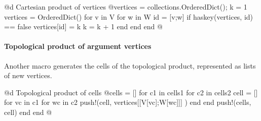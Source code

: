 @d Cartesian product of vertices  
@{vertices = collections.OrderedDict(); 
k = 1
vertices = OrderedDict()
for v in V
    for w in W
        id = [v;w]
        if haskey(vertices, id) == false
            vertices[id] = k
            k = k + 1
        end
    end
end
@}


\paragraph{Topological product of argument vertices}
Another macro generates the cells of the topological product, represented as lists of new vertices. 

@d Topological product of cells    
@{cells = []
for c1 in cells1
    for c2 in cells2
        cell = []
        for vc in c1
            for wc in c2 
                push!(cell, vertices[[V[vc];W[wc]]] )
            end
        end
        push!(cells, cell)
    end
end
@}

